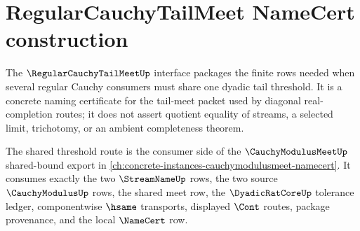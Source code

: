 \chapter{RegularCauchyTailMeet NameCert construction}
\label{ch:concrete-instances-regular-cauchy-tail-meet-namecert}

The $\RegularCauchyTailMeetUp$ interface packages the finite rows needed when several regular Cauchy consumers must share one dyadic tail threshold. It is a concrete naming certificate for the tail-meet packet used by diagonal real-completion routes; it does not assert quotient equality of streams, a selected limit, trichotomy, or an ambient completeness theorem.

The shared threshold route is the consumer side of the $\CauchyModulusMeetUp$ shared-bound export in \autoref{ch:concrete-instances-cauchymodulusmeet-namecert}. It consumes exactly the two $\StreamNameUp$ rows, the two source $\CauchyModulusUp$ rows, the shared meet row, the $\DyadicRatCoreUp$ tolerance ledger, componentwise $\hsame$ transports, displayed $\Cont$ routes, package provenance, and the local $\NameCert$ row.

